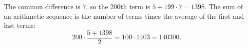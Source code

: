 The common difference is $7$, so the $200$th term is $5+199\cdot7=1398$. The sum of an arithmetic sequence is the number of terms times the average of the first and last terms:
\[
200\cdot\dfrac{5+1398}{2}=100\cdot1403=\boxed{140300}.
\]

